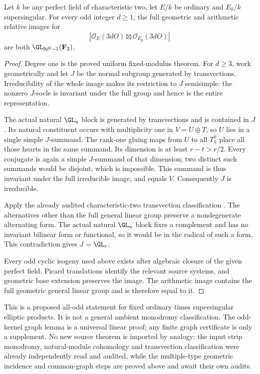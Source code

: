 \begin{theorem}
\label{thm:mixed-every-fixed-modulus-all-odd-candidate}
Let $k$ be any perfect field of characteristic two, let $E/k$
be ordinary and $E_0/k$ supersingular. For every odd integer
$d\geq1$, the full geometric and arithmetic relative images
for
\[
       |\mathcal O_E(3dO)\boxtimes\mathcal O_{E_0}(3dO)|
\]
are both $\GL_{9d^2-1}(\mathbf F_2)$.
\end{theorem}
\begin{proof}
Degree one is the proved uniform fixed-modulus theorem.
For $d\geq3$, work geometrically and let $J$ be the normal
subgroup generated by transvections. Irreducibility of the
whole image makes its restriction to $J$ semisimple: the
nonzero $J$-socle is invariant under the full group and hence
is the entire representation.

The actual natural $\GL_u$ block is generated by transvections
and is contained in $J$. Its natural constituent occurs with
multiplicity one in $V=U\oplus T$, so $U$ lies in a single
simple $J$-summand. The rank-one gluing maps from $U$ to all
$T_h^0$ place all those hearts in the same summand. Its dimension
is at least $r-t>r/2$. Every conjugate is again a simple
$J$-summand of that dimension; two distinct such summands
would be disjoint, which is impossible. This summand is thus
invariant under the full irreducible image, and equals $V$.
Consequently $J$ is irreducible.

Apply the already audited characteristic-two transvection
classification \cite[Theorem~3.6, printed p.~22]{KantorSeress2001}.
The alternatives other than the full general linear group
preserve a nondegenerate alternating form. The actual natural
$\GL_u$ block fixes a complement and has no invariant
bilinear form or functional, so it would be in the radical
of such a form. This contradiction gives $J=\GL_r$.

Every odd cyclic isogeny used above exists after algebraic
closure of the given perfect field. Picard translations
identify the relevant source systems, and geometric base
extension preserves the image. The arithmetic image contains
the full geometric general linear group and is therefore
equal to it.
\end{proof}

\begin{remark}
\label{rem:mixed-all-odd-norm-scope-candidate}
This is a proposed all-odd statement for fixed ordinary times
supersingular elliptic products. It is not a general ambient
monodromy classification. The odd-kernel graph lemma is a
universal linear proof; any finite graph certificate is only
a supplement. No new source theorem is imported by analogy:
the input strip monodromy, natural-module cohomology and
transvection classification were already independently read
and audited, while the multiple-type geometric incidence and
common-graph steps are proved above and await their own audits.
\end{remark}

